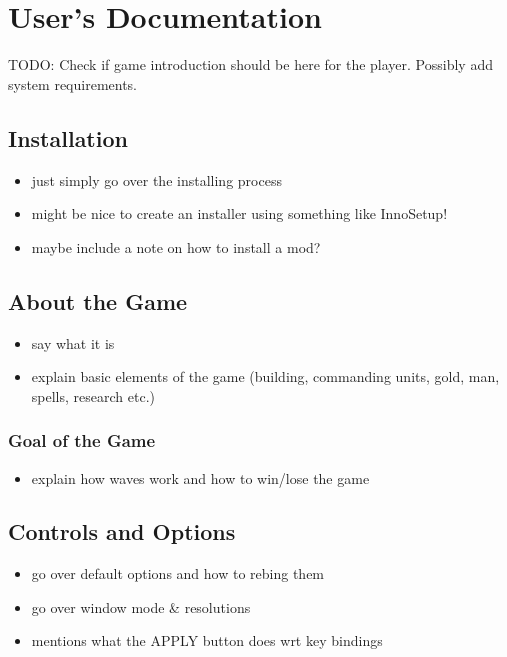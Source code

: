 \chapter{User's Documentation}

TODO: Check if game introduction should be here for the player.
Possibly add system requirements.

\section{Installation}

\begin{itemize}
    \item just simply go over the installing process
    \item might be nice to create an installer using something like InnoSetup!
    \item maybe include a note on how to install a mod?
\end{itemize}

\section{About the Game}

\begin{itemize}
	\item say what it is
	\item explain basic elements of the game (building, commanding units, gold,
		man, spells, research etc.)
\end{itemize}

\subsection{Goal of the Game}

\begin{itemize}
    \item explain how waves work and how to win/lose the game
\end{itemize}

\section{Controls and Options}

\begin{itemize}
    \item go over default options and how to rebing them
    \item go over window mode \& resolutions
    \item mentions what the APPLY button does wrt key bindings
\end{itemize}

